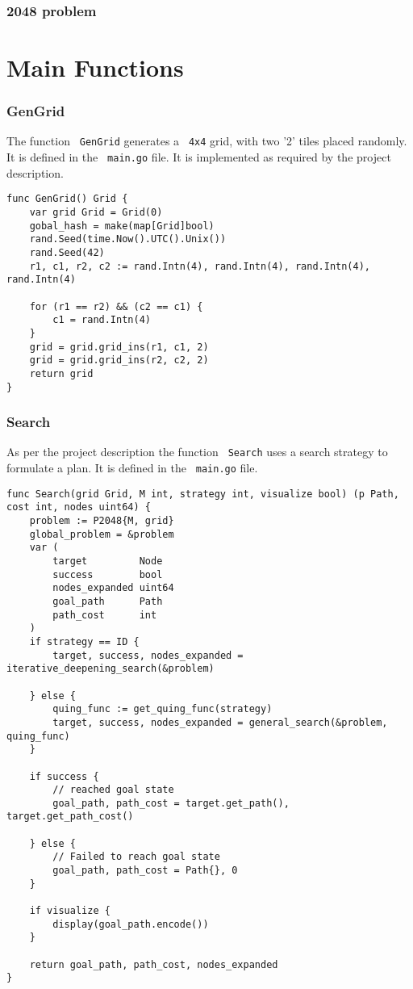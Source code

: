 \documentclass[14pt,a4paper]{report}
\begin{document}
\section{2048 problem}
    
\part{Main Functions}
\section{GenGrid}
The function \verb+ GenGrid+ generates a \verb+ 4x4+ grid, with two '2' tiles placed randomly.
It is defined in the \verb+ main.go+ file. It is implemented as required by the project description.
\begin{lstlisting}
func GenGrid() Grid {
    var grid Grid = Grid(0)
    gobal_hash = make(map[Grid]bool)
    rand.Seed(time.Now().UTC().Unix())
    rand.Seed(42)
    r1, c1, r2, c2 := rand.Intn(4), rand.Intn(4), rand.Intn(4), rand.Intn(4)

    for (r1 == r2) && (c2 == c1) {
        c1 = rand.Intn(4)
    }
    grid = grid.grid_ins(r1, c1, 2)
    grid = grid.grid_ins(r2, c2, 2)
    return grid
}
\end{lstlisting}
\section{Search}
As per the project description the function \verb+ Search+ uses a search strategy to 
formulate a plan. It is defined in the \verb+ main.go+ file.
\begin{lstlisting}
func Search(grid Grid, M int, strategy int, visualize bool) (p Path, cost int, nodes uint64) {
    problem := P2048{M, grid}
    global_problem = &problem
    var (
        target         Node
        success        bool
        nodes_expanded uint64
        goal_path      Path
        path_cost      int
    )
    if strategy == ID {
        target, success, nodes_expanded = iterative_deepening_search(&problem)

    } else {
        quing_func := get_quing_func(strategy)
        target, success, nodes_expanded = general_search(&problem, quing_func)
    }

    if success {
        // reached goal state
        goal_path, path_cost = target.get_path(), target.get_path_cost()

    } else {
        // Failed to reach goal state
        goal_path, path_cost = Path{}, 0
    }

    if visualize {
        display(goal_path.encode())
    }

    return goal_path, path_cost, nodes_expanded
}
\end{lstlisting}
\end{document}

